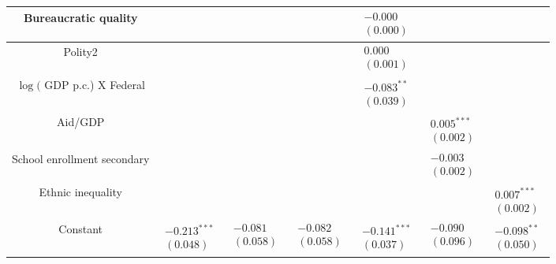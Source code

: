 \documentclass[10pt]{article}
\begin{document}
\begin{center}
\begin{tabular}{|c|c|c|c|c|c|c|}
\hline
Bureaucratic quality &  &  &  & $\begin{array}{l}-0.000 \\ (0.000)\end{array}$ &  &  \\
\hline
Polity2 &  &  &  & $\begin{array}{l}0.000 \\ (0.001)\end{array}$ &  &  \\
\hline
$\log ($ GDP p.c.) X Federal &  &  &  & $\begin{array}{l}-0.083^{* *} \\ (0.039)\end{array}$ &  &  \\
\hline
Aid/GDP &  &  &  &  & $\begin{array}{l}0.005^{* * *} \\ (0.002)\end{array}$ &  \\
\hline
School enrollment secondary &  &  &  &  & $\begin{array}{l}-0.003 \\ (0.002)\end{array}$ &  \\
\hline
Ethnic inequality &  &  &  &  &  & $\begin{array}{l}0.007^{* * *} \\ (0.002)\end{array}$ \\
\hline
Constant & $\begin{array}{l}-0.213^{* * *} \\ (0.048)\end{array}$ & $\begin{array}{l}-0.081 \\ (0.058)\end{array}$ & $\begin{array}{l}-0.082 \\ (0.058)\end{array}$ & $\begin{array}{l}-0.141^{* * *} \\ (0.037)\end{array}$ & $\begin{array}{l}-0.090 \\ (0.096)\end{array}$ & $\begin{array}{l}-0.098^{* *} \\ (0.050)\end{array}$ \\

\end{tabular}
\end{center}
\end{document}

